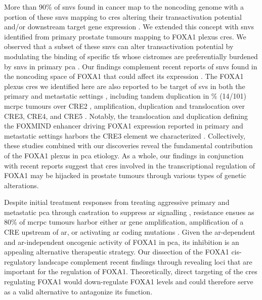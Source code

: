 More than 90\% of \glspl{snv} found in cancer map to the noncoding genome \cite{meltonRecurrentSomaticMutations2015,mazrooeiCistromePartitioningReveals2019} with a portion of these \glspl{snv} mapping to \glspl{cre} altering their transactivation potential \cite{baileyNoncodingSomaticInherited2016,zhangIntegrativeFunctionalGenomics2012,huangHighlyRecurrentTERT2013,hornTERTPromoterMutations2013} and/or downstream target gene expression \cite{zhouEmergenceNoncodingCancer2016,meltonRecurrentSomaticMutations2015,weinholdGenomewideAnalysisNoncoding2014}.
We extended this concept with \glspl{snv} identified from primary prostate tumours mapping to FOXA1 plexus \glspl{cre}.
We observed that a subset of these \glspl{snv} can alter transactivation potential by modulating the binding of specific \glspl{tf} whose cistromes are preferentially burdened by \glspl{snv} in primary \gls{pca} \cite{mazrooeiCistromePartitioningReveals2019}.
Our findings complement recent reports of \glspl{snv} found in the noncoding space of FOXA1 that could affect its expression \cite{annalaFrequentMutationFOXA12018,camcapstudygroupSequencingProstateCancers2018}.
The FOXA1 plexus \glspl{cre} we identified here are also reported to be target of \glspl{sv} in both the primary and metastatic settings \cite{paroliaDistinctStructuralClasses2019,quigleyGenomicHallmarksStructural2018}, including tandem duplication in \% (14/101) \gls{mcrpc} tumours over CRE2 \cite{quigleyGenomicHallmarksStructural2018}, amplification, duplication and translocation over CRE3, CRE4, and CRE5 \cite{paroliaDistinctStructuralClasses2019}.
Notably, the translocation and duplication defining the FOXMIND enhancer driving FOXA1 expression reported in primary and metastatic settings harbors the CRE3 element we characterized \cite{paroliaDistinctStructuralClasses2019}.
Collectively, these studies combined with our discoveries reveal the fundamental contribution of the FOXA1 plexus in \gls{pca} etiology.
As a whole, our findings in conjunction with recent reports suggest that \glspl{cre} involved in the transcriptional regulation of FOXA1 may be hijacked in prostate tumours through various types of genetic alterations.

Despite initial treatment responses from treating aggressive primary and metastatic \gls{pca} through castration to suppress \gls{ar} signalling \cite{attardProstateCancer2016}, resistance ensues as 80\% of \gls{mcrpc} tumours harbor either \gls{ar} gene amplification, amplification of a CRE upstream of \gls{ar}, or activating \gls{ar} coding mutations \cite{robinsonIntegrativeClinicalGenomics2015,takedaSomaticallyAcquiredEnhancer2018,quigleyGenomicHallmarksStructural2018}.
Given the \gls{ar}-dependent \cite{yangCurrentPerspectivesFOXA12015,pomerantzAndrogenReceptorCistrome2015} and \gls{ar}-independent \cite{sunkelIntegrativeAnalysisIdentifies2017} oncogenic activity of FOXA1 in \gls{pca}, its inhibition is an appealing alternative therapeutic strategy.
Our dissection of the FOXA1 cis-regulatory landscape complement recent findings through revealing loci that are important for the regulation of FOXA1.
Theoretically, direct targeting of the \glspl{cre} regulating FOXA1 would down-regulate FOXA1 levels and could therefore serve as a valid alternative to antagonize its function.

